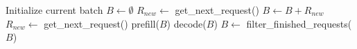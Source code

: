 \algrenewcommand\algorithmicindent{1em}
\begin{algorithm}[t!]
\caption{\Rls. New requests are admitted only if there are no decodes left (line 3). This optimizes TBT but wastes GPU compute in many decode-only iterations (line 10) with potentially small batch sizes.}
\label{alg:request_level}
\begin{algorithmic}[1]
\State Initialize current batch $B \leftarrow \emptyset$
        \State $R_{new} \leftarrow$ get\_next\_request()
            \State $B \leftarrow B + R_{new}$
            \State $R_{new} \leftarrow$ get\_next\_request()
        \EndWhile
        \State prefill($B$)
    \Else
        \State decode($B$)
        \State $B \leftarrow$ filter\_finished\_requests($B$)
    \EndIf
\EndWhile
\end{algorithmic}
\end{algorithm}
